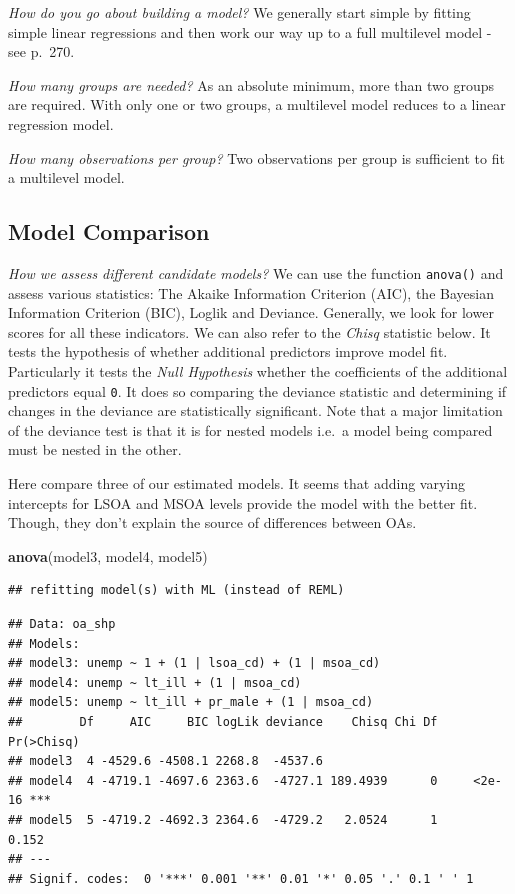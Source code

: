 \documentclass[]{book}
\newenvironment{Shaded}{\begin{snugshade}}{\end{snugshade}}
\newcommand{\KeywordTok}[1]{\textcolor[rgb]{0.13,0.29,0.53}{\textbf{#1}}}
\newcommand{\NormalTok}[1]{#1}
\begin{document}
\emph{How do you go about building a model?} We generally start simple
by fitting simple linear regressions and then work our way up to a full
multilevel model - see \citet{Gelman_Hill_2006_book} p.~270.

\emph{How many groups are needed?} As an absolute minimum, more than two
groups are required. With only one or two groups, a multilevel model
reduces to a linear regression model.

\emph{How many observations per group?} Two observations per group is
sufficient to fit a multilevel model.

\subsection{Model Comparison}\label{model-comparison}

\emph{How we assess different candidate models?} We can use the function
\texttt{anova()} and assess various statistics: The Akaike Information
Criterion (AIC), the Bayesian Information Criterion (BIC), Loglik and
Deviance. Generally, we look for lower scores for all these indicators.
We can also refer to the \emph{Chisq} statistic below. It tests the
hypothesis of whether additional predictors improve model fit.
Particularly it tests the \emph{Null Hypothesis} whether the
coefficients of the additional predictors equal \texttt{0}. It does so
comparing the deviance statistic and determining if changes in the
deviance are statistically significant. Note that a major limitation of
the deviance test is that it is for nested models i.e.~a model being
compared must be nested in the other.

Here compare three of our estimated models. It seems that adding varying
intercepts for LSOA and MSOA levels provide the model with the better
fit. Though, they don't explain the source of differences between OAs.

\begin{Shaded}
\begin{Highlighting}[]
\KeywordTok{anova}\NormalTok{(model3, model4, model5)}
\end{Highlighting}
\end{Shaded}

\begin{verbatim}
## refitting model(s) with ML (instead of REML)
\end{verbatim}

\begin{verbatim}
## Data: oa_shp
## Models:
## model3: unemp ~ 1 + (1 | lsoa_cd) + (1 | msoa_cd)
## model4: unemp ~ lt_ill + (1 | msoa_cd)
## model5: unemp ~ lt_ill + pr_male + (1 | msoa_cd)
##        Df     AIC     BIC logLik deviance    Chisq Chi Df Pr(>Chisq)    
## model3  4 -4529.6 -4508.1 2268.8  -4537.6                               
## model4  4 -4719.1 -4697.6 2363.6  -4727.1 189.4939      0     <2e-16 ***
## model5  5 -4719.2 -4692.3 2364.6  -4729.2   2.0524      1      0.152    
## ---
## Signif. codes:  0 '***' 0.001 '**' 0.01 '*' 0.05 '.' 0.1 ' ' 1
\end{verbatim}
\end{document}
